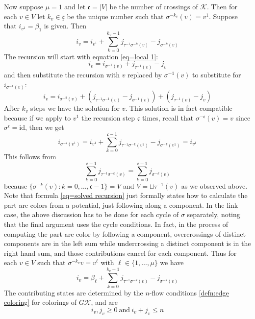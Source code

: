 \documentclass[11pt]{article}
\theoremstyle{definition}
\theoremstyle{remark}
\theoremstyle{remark}
\begin{document}
Now suppose $\mu =1$ and let $\mathfrak{c}=|V|$ be the number of crossings of $\mathcal{K}$. Then for each $v\in V$ let $k_v\in \underline{\mathfrak{c}}$ be the unique number such that $\sigma ^{-k_v}(v)=v^1$. Suppose that $i_{v^1}=\beta_1$ is given.  
Then 
\begin{equation}\label{eq=solved recursion}
i_v=i_{v^1}+\sum_{k=0}^{k_v-1}j_{\tau^{-1}\sigma^{-k}(v)}-j_{\sigma^{-k}(v)}
\end{equation}
The recursion will start with equation \eqref{eq=local 1}:
$$i_v=i_{\sigma^{-1}(v)}+j_{\tau^{-1}(v)}-j_v$$
and then substitute the recursion with $v$ replaced by $\sigma ^{-1}(v)$ to substitute for $i_{\sigma ^{-1}(v)}$:
$$i_v=i_{\sigma^{-2}(v)}+(j_{\tau^{-1}\sigma^{-1}(v)}-j_{\sigma^{-1}(v)})+(j_{\tau^{-1}(v)}-j_v)$$
After $k_v$ steps we have the solution for $v$. This solution is in fact compatible because if we apply to $v^1$ the recursion step 
$\mathfrak{c}$ times, recall that $\sigma^{-\mathfrak{c}}(v)=v$ since $\sigma^{\mathfrak{c}}=\textrm{id}$, then we get
$$i_{\sigma^{-\mathfrak{c}}(v^1)}=i_{v^1}+\sum_{k=0}^{\mathfrak{c}-1}j_{\tau^{-1}\sigma^{-k}(v^1)}-j_{\sigma^{-k}(v^1)}=i_{v^1}$$
This follows from
\begin{equation}\label{eq=cyclic}
\sum_{k=0}^{\mathfrak{c}-1}j_{\tau^{-1}\sigma^{-k}(v)}=\sum_{k=0}^{\mathfrak{c}-1}j_{\sigma^{-k}(v)}
\end{equation}
because $\{\sigma^{-k}(v):k=0,\ldots ,\mathfrak{c}-1\}=V$ and $V=\sqcup \tau^{-1}(v)$ as we observed above. 
Note that formula \eqref{eq=solved recursion} just formally states how to calculate the part arc colors from a potential, just following 
along a component. 
In the link case, the above discussion has to be done for each cycle of $\sigma $ separately, noting that the final argument uses the cycle conditions. In fact, in the process of computing the part arc color by following a component, overcrossings of distinct components are in the left sum while undercrossing a distinct component is in the right hand sum, and those contributions cancel for each component. Thus for each $v\in V$ such that $\sigma ^{-k_v}v=v^{\ell }$ with $\ell \in \{1,\ldots ,\mu\}$ we have 
\begin{equation}\label{eq=solved recursion link}
i_v=\beta_{\ell }+\sum_{k=0}^{k_v-1}j_{\tau^{-1}\sigma^{-k}(v)}-j_{\sigma^{-k}(v)}
\end{equation}
The contributing states are determined by the $n$-flow conditions \ref{defn:edge coloring} for colorings of $G\mathcal{K}$, and are
$$i_v,j_v\geq 0\ \textrm{and} \ i_v+j_v\leq n$$
\end{document}

